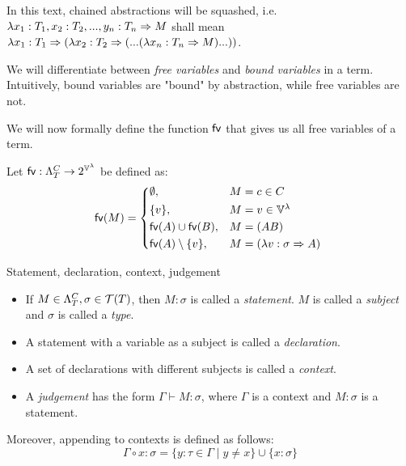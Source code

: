 \documentclass[main.tex]{subfiles}
\begin{document}
\begin{convention}
    In this text, chained abstractions will be squashed, i.e.
    $\lambda x_1 : T_1, x_2: T_2, ..., y_n: T_n \abstr M$ shall mean
    $\lambda x_1 : T_1 \abstr (\lambda x_2: T_2 \abstr (... (\lambda x_n: T_n \abstr M) ...))$.
\end{convention}

We will differentiate between \emph{free variables} and \emph{bound variables}
in a term. Intuitively, bound variables are "bound" by abstraction, while
free variables are not.

We will now formally define the function $\fvv$ that gives us all free variables of a
term.
\begin{defn}
    Let $\fvv : \plambda{T}{C} \rightarrow 2^{\lvars}$ be defined as:
    \[
        \fv{M} =
        \begin{cases*}
            \emptyset ,& $M = c \in C$ \\
            \{ v \} ,& $M = v \in \lvars$ \\
            \fv{A} \cup \fv{B} ,& $M = (AB)$ \\
            \fv{A} \setminus \{ v \} ,& $M = (\lambda v : \sigma \abstr A)$ \\
        \end{cases*}
    \]
\end{defn}

\begin{defn}
    \label{def:context}
    Statement, declaration, context, judgement \cite[chap.~2.4]{ttfp}
    \begin{itemize}
        \item If $M \in \plambda{T}{C}, \sigma \in \tclos{T}$, then $M : \sigma$ is called
            a \emph{statement}. $M$ is called a \emph{subject} and $\sigma$
            is called a \emph{type}.
        \item A statement with a variable as a subject is called a \emph{declaration}.
        \item A set of declarations with different subjects is called a \emph{context}.
        \item A \emph{judgement} has the form $\Gamma \vdash M: \sigma$, where
            $\Gamma$ is a context and $M: \sigma$ is a statement.
    \end{itemize}

    Moreover, appending to contexts is defined as follows:
    \[ \Gamma \circ x : \sigma = \{ y : \tau \in \Gamma \mid y \neq x \}
       \cup \{ x : \sigma \} \]
\end{defn}
\end{document}
